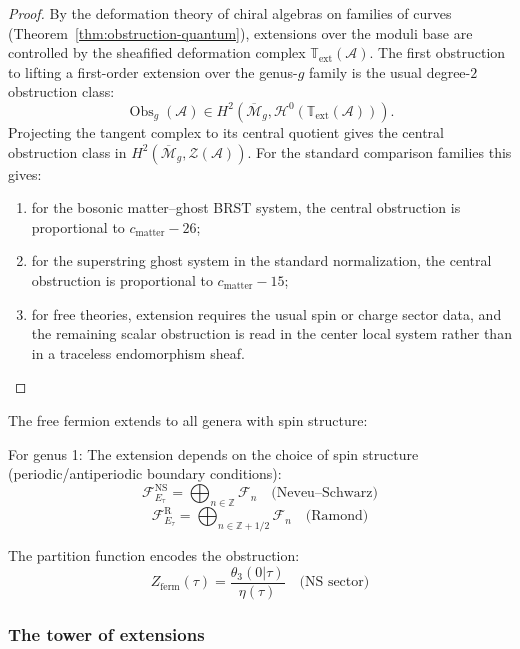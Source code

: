 \begin{proof}
By the deformation theory of chiral algebras on families of curves
(Theorem~\ref{thm:obstruction-quantum}), extensions over the moduli
base are controlled by the sheafified deformation complex
$\mathbb T_{\mathrm{ext}}(\mathcal A)$. The first obstruction to
lifting a first-order extension over the genus-$g$ family is the usual
degree-$2$ obstruction class:
\[
\operatorname{Obs}_g(\mathcal{A})
\in
H^2\!\left(\overline{\mathcal{M}}_g,
\mathcal H^0(\mathbb T_{\mathrm{ext}}(\mathcal A))\right).
\]
Projecting the tangent complex to its central quotient gives the
central obstruction class in
$H^2(\overline{\mathcal{M}}_g,\mathcal Z(\mathcal A))$. For the
standard comparison families this gives:
\begin{enumerate}
\item for the bosonic matter--ghost BRST system, the central obstruction
is proportional to $c_{\mathrm{matter}}-26$;
\item for the superstring ghost system in the standard normalization,
the central obstruction is proportional to $c_{\mathrm{matter}}-15$;
\item for free theories, extension requires the usual spin or charge
sector data, and the remaining scalar obstruction is read in the center
local system rather than in a traceless endomorphism sheaf.
\end{enumerate}
\end{proof}

\begin{example}
The free fermion extends to all genera with spin structure:

For genus 1: The extension depends on the choice of spin structure (periodic/antiperiodic boundary conditions):
\[
\mathcal{F}_{E_\tau}^{\text{NS}} = \bigoplus_{n \in \mathbb{Z}} \mathcal{F}_n \quad \text{(Neveu--Schwarz)}
\]
\[
\mathcal{F}_{E_\tau}^{\text{R}} = \bigoplus_{n \in \mathbb{Z} + 1/2} \mathcal{F}_n \quad \text{(Ramond)}
\]

The partition function encodes the obstruction:
\[
Z_{\text{ferm}}(\tau) = \frac{\theta_3(0|\tau)}{\eta(\tau)} \quad \text{(NS sector)}
\]
\end{example}

\subsubsection{The tower of extensions}

